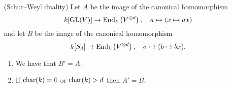 \begin{theorem}(Schur--Weyl duality)
  \label{theorem: schur weyl duality}
  Let $A$ be the image of the canonical homomorphism
  \[
            k[\operatorname{GL}(V)]
    \to     \operatorname{End}_k\left( V^{\mathbin{\otimes} d} \right),
    \quad   a
    \mapsto (x \mapsto ax)
  \]
  and let $B$ be the image of the canonical homomorphism
  \[
            k[S_d]
    \to     \operatorname{End}_k\left( V^{\mathbin{\otimes} d} \right),
    \quad   \sigma
    \mapsto (b \mapsto bx).
  \]
  \begin{enumerate}
    \item \label{enum: end gl = sd}
      We have that $B' = A$.
    \item \label{enum: end sd = gl}
      If $\operatorname{char}(k) = 0$ or $\operatorname{char}(k) > d$ then $A' = B$.
  \end{enumerate}
\end{theorem}



